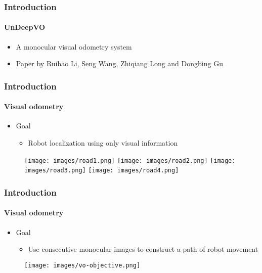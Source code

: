 \begin{frame}
    \frametitle{Introduction}
    \framesubtitle{UnDeepVO}
    \begin{itemize}
        \item A monocular visual odometry system
        \item Paper by Ruihao Li, Seng Wang, Zhiqiang Long and Dongbing Gu
    \end{itemize}
\end{frame}

\begin{frame}
    \frametitle{Introduction}
    \framesubtitle{Visual odometry}
    \begin{itemize}
        \item Goal
        \begin{itemize}
            \item Robot localization using only visual information
        \end{itemize}
    \end{itemize}
    \begin{figure}
        \texttt{[image: images/road1.png]}
        \texttt{[image: images/road2.png]}
        \texttt{[image: images/road3.png]}
        \texttt{[image: images/road4.png]}
    \end{figure}
\end{frame}

\begin{frame}
    \frametitle{Introduction}
    \framesubtitle{Visual odometry}
    \begin{itemize}
        \item Goal
        \begin{itemize}
            \item Use consecutive monocular images to construct a path of robot movement
        \end{itemize}
    \end{itemize}
    \begin{figure}
        \texttt{[image: images/vo-objective.png]}
    \end{figure}
\end{frame}
